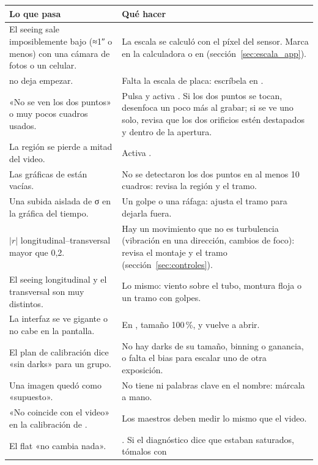 \begin{table}[H]
\centering\small
\begin{tabularx}{\linewidth}{@{}>{\RaggedRight}p{5.6cm} Y@{}}
\toprule
Lo que pasa & Qué hacer\\
\midrule
El seeing sale imposiblemente bajo (≈1″ o menos) con una cámara de fotos o un celular. & La escala se calculó con el
píxel del sensor. Marca  en la calculadora o en 
(sección~\ref{sec:escala_app}).\\
 no deja empezar. & Falta la escala de placa: escríbela en .\\
«No se ven los dos puntos» o muy pocos cuadros usados. & Pulsa  y activa
. Si los dos puntos se tocan, desenfoca un poco más al grabar; si se ve uno solo, revisa que
los dos orificios estén destapados y dentro de la apertura.\\
La región se pierde a mitad del video. & Activa .\\
Las gráficas de  están vacías. & No se detectaron los dos puntos en al menos 10 cuadros: revisa la
región y el tramo.\\
Una subida aislada de σ en la gráfica del tiempo. & Un golpe o una ráfaga: ajusta el tramo para dejarla fuera.\\
$|r|$ longitudinal–transversal mayor que 0,2. & Hay un movimiento que no es turbulencia (vibración en una dirección,
cambios de foco): revisa el montaje y el tramo (sección~\ref{sec:controles}).\\
El seeing longitudinal y el transversal son muy distintos. & Lo mismo: viento sobre el tubo, montura floja o un
tramo con golpes.\\
La interfaz se ve gigante o no cabe en la pantalla. & En , tamaño 100\,\%, y vuelve a abrir.\\
El plan de calibración dice «sin darks» para un grupo. & No hay darks de su tamaño, binning o ganancia, o falta el bias
para escalar uno de otra exposición.\\
Una imagen quedó como «supuesto». & No tiene  ni palabras clave en el nombre: márcala a mano.\\
«No coincide con el video» en la calibración de . & Los maestros deben medir lo mismo que el video.\\
El flat «no cambia nada». & . Si el diagnóstico dice que estaban saturados, tómalos con

\end{tabularx}
\end{table}
